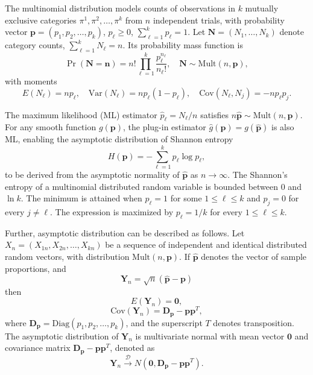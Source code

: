 The multinomial distribution models counts of observations in $k$ mutually exclusive categories $\pi^1,\pi^2,\dots,\pi^k$ from $n$ independent trials, with probability vector $\mathbf{p} = (p_1, p_2, \dots, p_k)$, $p_\ell \ge 0$, $\sum_{\ell=1}^k p_\ell = 1$. Let $\mathbf{N} = (N_1, \dots, N_k)$ denote category counts, $\sum_{\ell=1}^k N_\ell = n$. Its probability mass function is
\[
\Pr(\mathbf{N} = \mathbf{n}) = n! \prod_{\ell=1}^k \frac{p_\ell^{n_\ell}}{n_\ell!}, \quad \mathbf{N} \sim \mathrm{Mult}(n, \mathbf{p}),
\]
with moments
\[
E(N_\ell) = n p_\ell, \quad
\mathrm{Var}(N_\ell) = n p_\ell (1-p_\ell), \quad
\mathrm{Cov}(N_\ell, N_j) = -n p_\ell p_j.
\]

The maximum likelihood (ML) estimator $\widehat{p}_\ell = N_\ell / n$ satisfies $n\widehat{\mathbf{p}} \sim \mathrm{Mult}(n,\mathbf{p})$. For any smooth function $g(\mathbf{p})$, the plug-in estimator $\widehat{g}(\mathbf{p}) = g(\widehat{\mathbf{p}})$ is also ML, enabling the asymptotic distribution of Shannon entropy
\begin{equation}
	H(\mathbf{p}) = -\sum_{\ell=1}^k p_\ell \log p_\ell,
	\label{eq:AsymEntropy}
\end{equation}
to be derived from the asymptotic normality of $\widehat{\mathbf{p}}$ as $n \to \infty$.
The Shannon's entropy of a multinomial distributed random variable is bounded between 0 and $\ln k$. The minimum is attained when $p_{\ell}=1$ for some $1\leq \ell \leq k$ and $p_j=0$ for every $j\ne \ell$. The expression is maximized by $p_{\ell}=1/k$ for every $1\leq \ell \leq k$.  

Further, asymptotic distribution can be described as follows. Let $X_n=(X_{1n},X_{2n},\dots,X_{kn})$ be a sequence of independent and identical distributed random vectors, with distribution $\text{Mult}(n,\mathbf{p})$. If $\widehat{\mathbf{p}}$ denotes the vector of sample proportions, and 
\[\mathbf{Y}_n=\sqrt{n}(\widehat{\mathbf{p}}-\mathbf{p})\] 
then
\[E(\mathbf{Y}_n)=\bm 0,\]
\[\text{Cov}(\mathbf{Y}_n)=\mathbf{D_p}-\mathbf{pp}^T,\]
where $\mathbf{D_p}=\text{Diag}(p_1,p_2,\dots,p_k)$, and the superscript $T$ denotes transposition. The asymptotic distribution of $\mathbf{Y}_n$ is multivariate normal with mean vector $\bm 0$ and covariance matrix $\mathbf{D_p}-\mathbf{pp}^T$, denoted as
%
\begin{equation}
	\mathbf{Y}_n \xrightarrow{\mathscr{D}} N(\mathbf{0}, \mathbf{D_p}-\mathbf{pp}^T).
	\label{eq:Cov} 
\end{equation}
 
